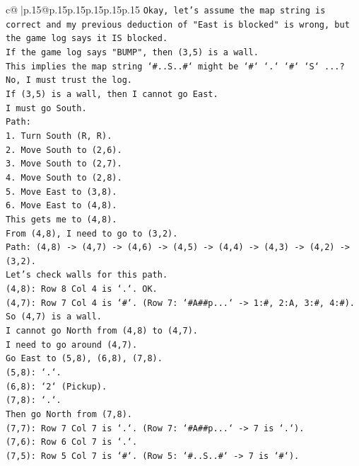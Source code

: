 \documentclass{article}
\begin{document}
{\begin{supertabular}{c@{$\;$}|p{.15\linewidth}@{}p{.15\linewidth}p{.15\linewidth}p{.15\linewidth}p{.15\linewidth}p{.15\linewidth}}
{{{\texttt{Okay, let's assume the map string is correct and my previous deduction of "East is blocked" is wrong, but the game log says it IS blocked.} \\
\texttt{If the game log says "BUMP", then (3,5) is a wall.} \\
\texttt{This implies the map string `\#..S..\#` might be `\#` `.` `\#` `S` ...? No, I must trust the log.} \\
\texttt{If (3,5) is a wall, then I cannot go East.} \\
\texttt{I must go South.} \\
\texttt{Path:} \\
\texttt{1. Turn South (R, R).} \\
\texttt{2. Move South to (2,6).} \\
\texttt{3. Move South to (2,7).} \\
\texttt{4. Move South to (2,8).} \\
\texttt{5. Move East to (3,8).} \\
\texttt{6. Move East to (4,8).} \\
\texttt{This gets me to (4,8).} \\
\texttt{From (4,8), I need to go to (3,2).} \\
\texttt{Path: (4,8) {-}> (4,7) {-}> (4,6) {-}> (4,5) {-}> (4,4) {-}> (4,3) {-}> (4,2) {-}> (3,2).} \\
\texttt{Let's check walls for this path.} \\
\texttt{(4,8): Row 8 Col 4 is `.`. OK.} \\
\texttt{(4,7): Row 7 Col 4 is `\#`. (Row 7: `\#A\#\#p...` {-}> 1:\#, 2:A, 3:\#, 4:\#).} \\
\texttt{So (4,7) is a wall.} \\
\texttt{I cannot go North from (4,8) to (4,7).} \\
\texttt{I need to go around (4,7).} \\
\texttt{Go East to (5,8), (6,8), (7,8).} \\
\texttt{(5,8): `.`.} \\
\texttt{(6,8): `2` (Pickup).} \\
\texttt{(7,8): `.`.} \\
\texttt{Then go North from (7,8).} \\
\texttt{(7,7): Row 7 Col 7 is `.`. (Row 7: `\#A\#\#p...` {-}> 7 is `.`).} \\
\texttt{(7,6): Row 6 Col 7 is `.`.} \\
\texttt{(7,5): Row 5 Col 7 is `\#`. (Row 5: `\#..S..\#` {-}> 7 is `\#`).} \\
}}}
\end{supertabular}}
\end{document}
